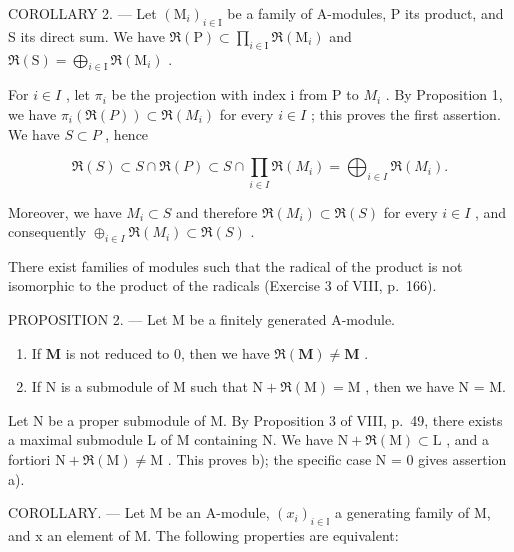 COROLLARY 2. --- Let \((\mathrm{M}_{i})_{i\in\mathrm{I}}\) be a family of A-modules, P its product, and S its direct sum. We have \(\Re(\mathrm{P})\subset\prod_{i\in\mathrm{I}}\Re(\mathrm{M}_{i})\) and \(\Re(\mathrm{S})=\bigoplus_{i\in\mathrm{I}}\Re(\mathrm{M}_{i})\) .

For \(i \in I\) , let \(\pi_{i}\) be the projection with index i from P to \(M_{i}\) . By Proposition 1, we have \(\pi_{i}(\mathfrak{R}(P)) \subset \mathfrak{R}(M_{i})\) for every \(i \in I\) ; this proves the first assertion. We have \(S \subset P\) , hence

\[
\mathfrak {R} (S) \subset S \cap \mathfrak {R} (P) \subset S \cap \prod_ {i \in I} \mathfrak {R} (M _ {i}) = \bigoplus_ {i \in I} \mathfrak {R} (M _ {i}).
\]

Moreover, we have \(M_{i} \subset S\) and therefore \(\Re(M_{i}) \subset \Re(S)\) for every \(i \in I\) , and consequently \(\oplus_{i \in I} \Re(M_{i}) \subset \Re(S)\) .

There exist families of modules such that the radical of the product is not isomorphic to the product of the radicals (Exercise 3 of VIII, p.~166).

PROPOSITION 2. --- Let M be a finitely generated A-module.

\begin{enumerate}
\def\labelenumi{\alph{enumi})}
\item
  If \(\mathbf{M}\) is not reduced to 0, then we have \(\Re (\mathbf{M})\neq \mathbf{M}\) .
\item
  If N is a submodule of M such that \(\mathrm{N} + \Re(\mathrm{M}) = \mathrm{M}\) , then we have N = M.
\end{enumerate}

Let N be a proper submodule of M. By Proposition 3 of VIII, p.~49, there exists a maximal submodule L of M containing N. We have \(\mathrm{N} + \Re(\mathrm{M}) \subset \mathrm{L}\) , and a fortiori \(\mathrm{N} + \Re(\mathrm{M}) \neq \mathrm{M}\) . This proves b); the specific case N = 0 gives assertion a).

COROLLARY. --- Let M be an A-module, \((x_{i})_{i\in\mathbb{I}}\) a generating family of M, and x an element of M. The following properties are equivalent:

